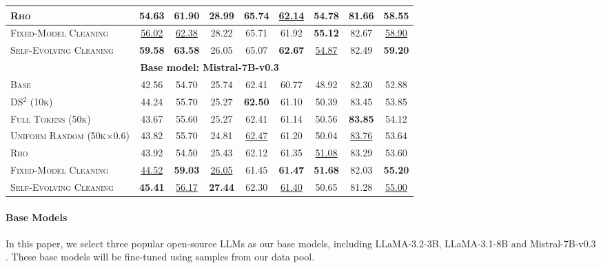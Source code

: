 \begin{table*}[ht]
{\begin{tabular}{l|ccccccc|c}
\textsc{Rho} & 54.63 & 61.90 & \textbf{28.99} & 65.74 & \underline{62.14} & 54.78 & 81.66 & 58.55 \\
\midrule
\textsc{Fixed-Model Cleaning} & \underline{56.02} & \underline{62.38} & 28.22 & 65.71 & 61.92 & \textbf{55.12} & 82.67 & \underline{58.90 } \\
\textsc{Self-Evolving Cleaning}    & \textbf{59.58} & \textbf{63.58} & 26.05 & 65.07 & \textbf{62.67} & \underline{54.87} & 82.49 & \textbf{59.20}\\
\toprule
    \multicolumn{9}{c}{\cellcolor{blue!10} \textbf{Base model: Mistral-7B-v0.3}} \\
    \midrule
    \textsc{Base} & 42.56 & 54.70 & 25.74 & 62.41 & 60.77 & 48.92 & 82.30 & 52.88 \\
    \textsc{DS$^2$ (10k)} & 44.24 & 55.70 & 25.27 & \textbf{62.50} & 61.10 & 50.39 & 83.45 & 53.85 \\ 
    \textsc{Full Tokens (50k)} & 43.67 & 55.60 & 25.27 & 62.41 & 61.14 & 50.56 & \textbf{83.85} & 54.12 \\
    \textsc{Uniform Random (50k$\times$0.6)} & 43.82 & 55.70 & 24.81 & \underline{62.47} & 61.20 & 50.04 & \underline{83.76} & 53.64 \\
    \textsc{Rho} & 43.92 & 54.50 & 25.43 & 62.12 & 61.35 & \underline{51.08} & 83.29 & 53.60 \\
    \midrule
\textsc{Fixed-Model Cleaning}  & \underline{44.52} & \textbf{59.03} & \underline{26.05} & 61.45 & \textbf{61.47} & \textbf{51.68} & 82.03 & \textbf{55.20} \\
\textsc{Self-Evolving Cleaning}  & \textbf{45.41} & \underline{56.17} & \textbf{27.44} & 62.30 & \underline{61.40} & 50.65 & 81.28 & \underline{ 55.00} \\
\bottomrule
\end{tabular}
    }
    \label{tab:main_results}
\end{table*}



\paragraph{Base Models} In this paper, we select three popular open-source LLMs as our base models, including LLaMA-3.2-3B, LLaMA-3.1-8B \citep{dubey2024llama} and Mistral-7B-v0.3 \citep{jiang2023mistral}. These base models will be fine-tuned using samples from our data pool. 

